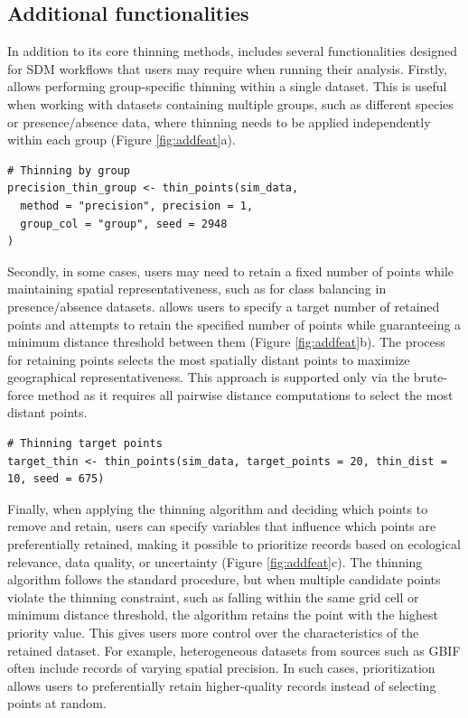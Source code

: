 \subsection{Additional functionalities}\label{additional-functionalities}

In addition to its core thinning methods,  includes several functionalities designed for SDM workflows that users may require when running their analysis. Firstly,  allows performing group-specific thinning within a single dataset. This is useful when working with datasets containing multiple groups, such as different species or presence/absence data, where thinning needs to be applied independently within each group (Figure \ref{fig:addfeat}a).

\begin{verbatim}
# Thinning by group
precision_thin_group <- thin_points(sim_data,
  method = "precision", precision = 1,
  group_col = "group", seed = 2948
)
\end{verbatim}

Secondly, in some cases, users may need to retain a fixed number of points while maintaining spatial representativeness, such as for class balancing in presence/absence datasets.  allows users to specify a target number of retained points and attempts to retain the specified number of points while guaranteeing a minimum distance threshold between them (Figure \ref{fig:addfeat}b). The process for retaining points selects the most spatially distant points to maximize geographical representativeness. This approach is supported only via the brute-force method as it requires all pairwise distance computations to select the most distant points.

\begin{verbatim}
# Thinning target points
target_thin <- thin_points(sim_data, target_points = 20, thin_dist = 10, seed = 675)
\end{verbatim}

Finally, when applying the thinning algorithm and deciding which points to remove and retain, users can specify variables that influence which points are preferentially retained, making it possible to prioritize records based on ecological relevance, data quality, or uncertainty (Figure \ref{fig:addfeat}c). The thinning algorithm follows the standard procedure, but when multiple candidate points violate the thinning constraint, such as falling within the same grid cell or minimum distance threshold, the algorithm retains the point with the highest priority value. This gives users more control over the characteristics of the retained dataset. For example, heterogeneous datasets from sources such as GBIF often include records of varying spatial precision. In such cases, prioritization allows users to preferentially retain higher-quality records instead of selecting points at random.

